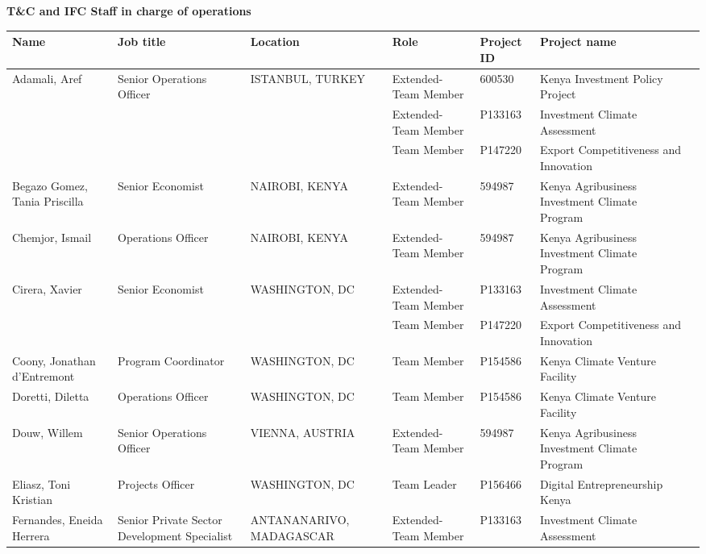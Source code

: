 \documentclass{article}\usepackage[]{graphicx}\usepackage[]{color}
\begin{document}
\begin{minipage}[b]{0.99\textwidth}
  \vspace*{1cm}
  \raggedright{\color{white!30!blue} \textbf{\large T\&C and IFC Staff in charge of operations}}
  \vspace*{0.5cm}
     
{\footnotesize
\begin{longtable}{>{\raggedright}p{1.4in}>{\raggedright}p{1in}>{\raggedright}p{1in}>{\raggedright}p{1in}l>{\raggedright}p{1.5in}l}
 Name & Job title & Location & Role & Project ID & Project name &  \\ 
  \hline
Adamali, Aref & Senior Operations Officer & ISTANBUL, TURKEY & Extended-Team Member & 600530 & Kenya Investment Policy Project &  \\ 
   &  &  & Extended-Team Member & P133163 & Investment Climate Assessment &  \\ 
   &  &  & Team Member & P147220 & Export Competitiveness and Innovation &  \\ 
  Begazo Gomez, Tania Priscilla & Senior Economist & NAIROBI, KENYA & Extended-Team Member & 594987 & Kenya Agribusiness Investment Climate Program &  \\ 
  Chemjor, Ismail & Operations Officer & NAIROBI, KENYA & Extended-Team Member & 594987 & Kenya Agribusiness Investment Climate Program &  \\ 
  Cirera, Xavier & Senior Economist & WASHINGTON, DC & Extended-Team Member & P133163 & Investment Climate Assessment &  \\ 
   &  &  & Team Member & P147220 & Export Competitiveness and Innovation &  \\ 
  Coony, Jonathan d'Entremont & Program Coordinator & WASHINGTON, DC & Team Member & P154586 & Kenya Climate Venture Facility &  \\ 
  Doretti, Diletta & Operations Officer & WASHINGTON, DC & Team Member & P154586 & Kenya Climate Venture Facility &  \\ 
  Douw, Willem & Senior Operations Officer & VIENNA, AUSTRIA & Extended-Team Member & 594987 & Kenya Agribusiness Investment Climate Program &  \\ 
  Eliasz, Toni Kristian & Projects Officer & WASHINGTON, DC & Team Leader & P156466 & Digital Entrepreneurship Kenya &  \\ 
  Fernandes, Eneida Herrera & Senior Private Sector Development Specialist & ANTANANARIVO, MADAGASCAR & Extended-Team Member & P133163 & Investment Climate Assessment &  \\ 

\end{longtable}}
\end{minipage}
\end{document}
